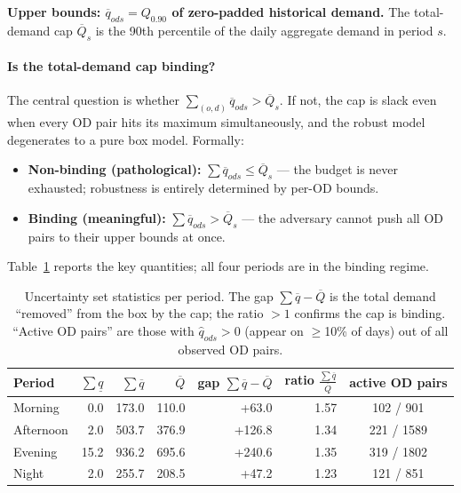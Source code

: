 \documentclass[11pt]{article}
\theoremstyle{definition}
\begin{document}
\textbf{Upper bounds: $\overline{q}_{ods} = Q_{0.90}$ of zero-padded historical demand.}
The total-demand cap $\overline{Q}_s$ is the 90th percentile of the daily
aggregate demand in period $s$.

\paragraph{Is the total-demand cap binding?}
The central question is whether
$\sum_{(o,d)}\overline{q}_{ods} > \overline{Q}_s$.
If not, the cap is slack even when every OD pair hits its maximum simultaneously,
and the robust model degenerates to a pure box model.  Formally:
\begin{itemize}
	\item \textbf{Non-binding (pathological):}\;
	      $\sum\overline{q}_{ods} \le \overline{Q}_s$ — the budget is never
	      exhausted; robustness is entirely determined by per-OD bounds.
	\item \textbf{Binding (meaningful):}\;
	      $\sum\overline{q}_{ods} > \overline{Q}_s$ — the adversary cannot push
	      all OD pairs to their upper bounds at once.
\end{itemize}
Table~\ref{tab:uset-numbers} reports the key quantities; all four periods are
in the binding regime.

\begin{table}[h]
	\centering
	\begin{tabular}{lrrrrrc}
		\toprule
		Period                                        & $\sum\underline{q}$ & $\sum\overline{q}$ & $\overline{Q}$ &
		gap $\sum\overline{q}-\overline{Q}$           &
		ratio $\frac{\sum\overline{q}}{\overline{Q}}$ & active OD pairs                                                                        \\
		\midrule
		Morning                                       & 0.0                 & 173.0              & 110.0          & +63.0  & 1.57 & 102 / 901  \\
		Afternoon                                     & 2.0                 & 503.7              & 376.9          & +126.8 & 1.34 & 221 / 1589 \\
		Evening                                       & 15.2                & 936.2              & 695.6          & +240.6 & 1.35 & 319 / 1802 \\
		Night                                         & 2.0                 & 255.7              & 208.5          & +47.2  & 1.23 & 121 / 851  \\
		\bottomrule
	\end{tabular}
	\caption{Uncertainty set statistics per period.
		The gap $\sum\overline{q}-\overline{Q}$ is the total demand ``removed'' from
		the box by the cap; the ratio $>1$ confirms the cap is binding.
		``Active OD pairs'' are those with $\hat{q}_{ods}>0$ (appear on $\ge$10\% of
		days) out of all observed OD pairs.}
	\label{tab:uset-numbers}
\end{table}
\end{document}
